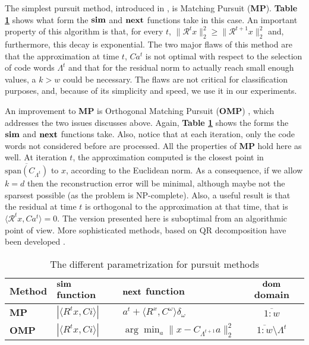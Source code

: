 \documentclass[runningheads,a4paper]{llncs}
\newcommand{\hcrange}[2]{\overline{{#1}\colon\!\!{#2}}}
\begin{document}
The simplest pursuit method, introduced in \cite{matchingpursuit1}, is Matching Pursuit (\textbf{MP}). \textbf{Table \ref{table:PursuitParametrization}} shows what form the $\text{\textbf{sim}}$ and $\text{\textbf{next}}$ functions take in this case. An important property of this algorithm is that, for every $t$, $\|\mathcal{R}^tx\|_2^2 \geq \|\mathcal{R}^{t+1}x\|_2^2$ and, furthermore, this decay is exponential. The two major flaws of this method are that the approximation at time $t$, $Ca^t$ is not optimal with respect to the selection of code words $\Lambda^t$ and that for the residual norm to actually reach small enough values, a $k > w$ could be necessary. The flaws are not critical for classification purposes, and, because of its simplicity and speed, we use it in our experiments.

An improvement to \textbf{MP} is Orthogonal Matching Pursuit (\textbf{OMP}) \cite{matchingpursuit2,orthopursuit,pursuitdifferences}, which addresses the two issues discusses above. Again, \textbf{Table \ref{table:PursuitParametrization}} shows the forms the $\text{\textbf{sim}}$ and $\text{\textbf{next}}$ functions take. Also, notice that at each iteration, only the code words not considered before are processed. All the properties of \textbf{MP} hold here as well. At iteration $t$, the approximation computed is the closest point in $\overline{\text{span}(C_{\Lambda^t})}$ to $x$, according to the Euclidean norm. As a consequence, if we allow $k = d$ then the reconstruction error will be minimal, although maybe not the sparsest possible (as the problem is NP-complete). Also, a useful result is that the residual at time $t$ is orthogonal to the approximation at that time, that is $\langle \mathcal{R}^tx , Ca^t \rangle = 0$. The version presented here is suboptimal from an algorithmic point of view. More sophisticated methods, based on QR decomposition have been developed \cite{matchingpursuit2,pursuitdifferences}.

\renewcommand{\arraystretch}{1.5}
\begin{table}
  \caption{The different parametrization for pursuit methods}
  \label{table:PursuitParametrization}
  \begin{tabularx}{\textwidth}{|l|>{\centering}X|>{\centering}X|c|}
       \hline
        Method & $\text{\textbf{sim}}$ function & $\text{\textbf{next}}$ function & $\text{\textbf{dom}}$ domain\\ \hline \hline
        \textbf{MP} & $\left| \langle R^tx , Ci \rangle \right|$ & $a^t + \langle R^x , C^\omega \rangle \delta_\omega$ & $\hcrange{1}{w}$ \\  \hline
        \textbf{OMP} & $\left| \langle R^tx , Ci \rangle \right|$ & $\arg\min_{a} {\| x - C_{\Lambda^{t+1}}a \|_2^2}$ & $\hcrange{1}{w} \setminus \Lambda^t$ \\
       \hline
    \end{tabularx}
\end{table}
\renewcommand{\arraystretch}{1.0}
\end{document}
